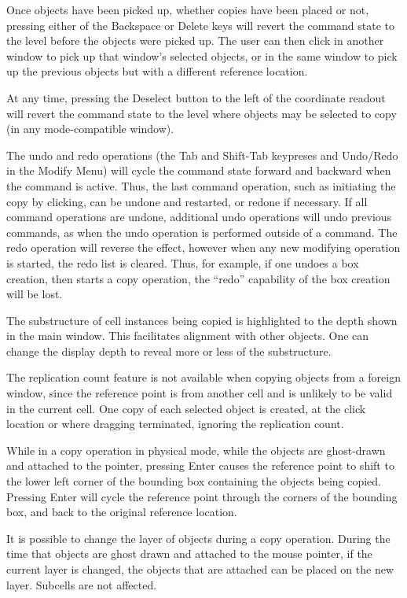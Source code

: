 Once objects have been picked up, whether copies have been placed or
not, pressing either of the {\kb Backspace} or {\kb Delete} keys will
revert the command state to the level before the objects were picked
up.  The user can then click in another window to pick up that
window's selected objects, or in the same window to pick up the
previous objects but with a different reference location.

At any time, pressing the {\cb Deselect} button to the left of the
coordinate readout will revert the command state to the level where
objects may be selected to copy (in any mode-compatible window).

The undo and redo operations (the {\kb Tab} and {\kb Shift-Tab}
keypreses and {\cb Undo}/{\cb Redo} in the {\cb Modify Menu}) will
cycle the command state forward and backward when the command is
active.  Thus, the last command operation, such as initiating the
copy by clicking, can be undone and restarted, or redone if
necessary.  If all command operations are undone, additional undo
operations will undo previous commands, as when the undo operation is
performed outside of a command.  The redo operation will reverse the
effect, however when any new modifying operation is started, the redo
list is cleared.  Thus, for example, if one undoes a box creation,
then starts a copy operation, the ``redo'' capability of the box
creation will be lost.

The substructure of cell instances being copied is highlighted to the
depth shown in the main window.  This facilitates alignment with other
objects.  One can change the display depth to reveal more or less of
the substructure.

The replication count feature is not available when copying objects
from a foreign window, since the reference point is from another cell
and is unlikely to be valid in the current cell.  One copy of each
selected object is created, at the click location or where dragging
terminated, ignoring the replication count.

While in a copy operation in physical mode, while the objects are
ghost-drawn and attached to the pointer, pressing {\kb Enter} causes
the reference point to shift to the lower left corner of the bounding
box containing the objects being copied.  Pressing {\kb Enter} will
cycle the reference point through the corners of the bounding box, and
back to the original reference location.

It is possible to change the layer of objects during a copy operation. 
During the time that objects are ghost drawn and attached to the mouse
pointer, if the current layer is changed, the objects that are
attached can be placed on the new layer.  Subcells are not affected. 

